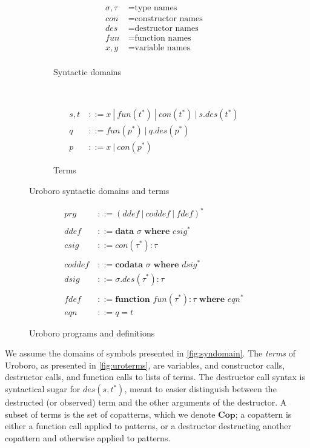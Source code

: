 \begin{figure}
\begin{subfigure}{0.5\textwidth}
\begin{align*}
\sigma, \tau ~&= \textrm{type names}&\\
con ~&= \textrm{constructor names}&\\
des ~&= \textrm{destructor names}&\\
fun ~&= \textrm{function names}&\\
x, y ~&= \textrm{variable names}&\\
\end{align*}
\caption{Syntactic domains}
\label{fig:syndomain}
\end{subfigure}
~
\begin{subfigure}{0.5\textwidth}
\begin{align*}
s, t ~&::= x ~ | ~ fun(t^*) ~ | ~ con(t^*) ~ | ~ s.des(t^*) &\\
q ~&::= fun(p^*) ~ | ~ q.des(p^*) &\\
p ~&::= x ~ | ~ con(p^*) &
\end{align*}
\caption{Terms}
\label{fig:uroterms}
\end{subfigure}
\caption{Uroboro syntactic domains and terms}
\end{figure}

\begin{figure}
\begin{align*}
prg ~&::= (ddef ~ | ~ coddef ~ | ~  fdef)^* &\\
~\\
ddef ~&::= \textbf{data } \sigma \textbf{ where } csig^* &\\
csig ~&::= con(\tau^*): \tau &\\
~\\
coddef ~&::= \textbf{codata } \sigma \textbf{ where } dsig^* &\\
dsig ~&::= \sigma.des(\tau^*): \tau &\\
~\\
fdef ~&::= \textbf{function } fun(\tau^*): \tau \textbf{ where } eqn^* &\\
eqn ~&::= q = t &
\end{align*}
\caption{Uroboro programs and definitions}
\label{fig:uroprogdefs}
\end{figure}

We assume the domains of symbols presented in \autoref{fig:syndomain}. The \textit{terms} of Uroboro, as presented in \autoref{fig:uroterms}, are variables, and constructor calls, destructor calls, and function calls to lists of terms. The destructor call syntax is syntactical sugar for $des(s, t^*)$, meant to easier distinguish between the destructed (or observed) term and the other arguments of the destructor. A subset of terms is the set of copatterns, which we denote $\mathbf{Cop}$; a copattern is either a function call applied to patterns, or a destructor destructing another copattern and otherwise applied to patterns.

